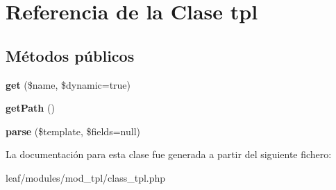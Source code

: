 \hypertarget{classtpl}{\section{Referencia de la Clase tpl}
\label{classtpl}
}
\subsection*{Métodos públicos}
\begin{DoxyCompactItemize}
\item 
\hypertarget{classtpl_aa894a674f303f1f4d88d86b3e2dae068}{{\bfseries get} (\$name, \$dynamic=true)}\label{classtpl_aa894a674f303f1f4d88d86b3e2dae068}

\item 
\hypertarget{classtpl_a30c5c67b2bf8e2e2ccc7e361faa20afe}{{\bfseries get\-Path} ()}\label{classtpl_a30c5c67b2bf8e2e2ccc7e361faa20afe}

\item 
\hypertarget{classtpl_abb8271df4df61a6144cc120a1b230efe}{{\bfseries parse} (\$template, \$fields=null)}\label{classtpl_abb8271df4df61a6144cc120a1b230efe}

\end{DoxyCompactItemize}


La documentación para esta clase fue generada a partir del siguiente fichero\-:\begin{DoxyCompactItemize}
\item 
leaf/modules/mod\-\_\-tpl/class\-\_\-tpl.\-php\end{DoxyCompactItemize}
